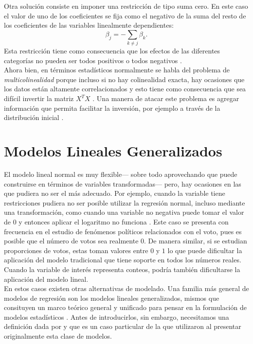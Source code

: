 Otra solución consiste en imponer una restricción de tipo suma cero. En este caso el valor de uno de los coeficientes se fija como el negativo de la suma del resto de los coeficientes de las variables linealmente dependientes:
\begin{equation*}
\beta_j=-\sum\limits_{k\neq j}\beta_k.
\end{equation*}
Esta restricción tiene como consecuencia que los efectos de las diferentes categorías no pueden ser todos positivos o todos negativos \parencite{Usi14}.\\

Ahora bien, en términos estadísticos normalmente se habla del problema de \textit{multicolinealidad} porque incluso si no hay colinealidad exacta, hay ocasiones que los datos están altamente correlacionados y esto tiene como consecuencia que sea difícil invertir la matriz $X^TX$ \parencite{Usi14}. Una manera de atacar este problema es agregar información que permita facilitar la inversión, por ejemplo a través de la distribución inicial \parencite{Congdon06}.\\ 


\section{Modelos Lineales Generalizados}

El modelo lineal normal es muy flexible--- sobre todo aprovechando que puede construirse en términos de variables transformadas--- pero, hay ocasiones en las que pudiera no ser el más adecuado. Por ejemplo, cuando la variable tiene restricciones pudiera no ser posible utilizar la regresión normal, incluso mediante una transformación, como cuando una variable no negativa puede tomar el valor de $0$ y entonces aplicar el logaritmo no funciona \parencite{Gelman13}. Este caso se presenta con frecuencia en el estudio de fenómenos políticos relacionados con el voto, pues es posible que el número de votos sea realmente $0$. De manera similar, si se estudian proporciones de votos, estas toman valores entre $0$ y $1$ lo que puede dificultar la aplicación del modelo tradicional que tiene soporte en todos los números reales. Cuando la variable de interés representa conteos, podría también dificultarse la aplicación del modelo lineal.\\ 

En estos casos existen otras alternativas de modelado. Una familia más general de modelos de regresión son los modelos lineales generalizados, mismos que consituyen un marco teórico general y unificado para pensar en la formulación de modelos estadísticos \parencites{Dobson01}. Antes de introducirlos, sin embargo, necesitamos una definición dada por \textcite{Nieto16} y que es un caso particular de la que utilizaron \textcite{NelderWedderburn72} al presentar originalmente esta clase de modelos. 

